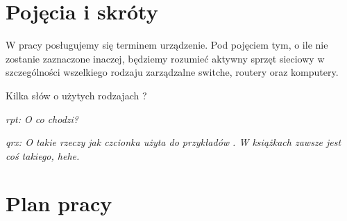\documentclass[00-praca-magisterska.tex]{subfiles}
\begin{document}
\section{Pojęcia i skróty}

W pracy posługujemy się terminem urządzenie. Pod pojęciem tym, o ile nie
zostanie zaznaczone inaczej, będziemy rozumieć aktywny sprzęt sieciowy w
szczególności wszelkiego rodzaju zarządzalne switche, routery oraz komputery.


Kilka słów o użytych rodzajach ?

\emph{rpt: O co chodzi?}

\emph{qrx: O takie rzeczy jak czcionka użyta do przykładów . W książkach zawsze jest coś takiego, hehe.}

\section{Plan pracy}

\end{document}

